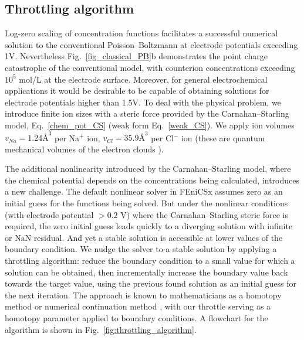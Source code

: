 \subsection{Throttling algorithm}

Log-zero scaling of concentration functions facilitates a successful numerical solution to
the conventional Poisson--Boltzmann at electrode potentials
exceeding 1V. Nevertheless Fig.~\ref{fig_classical_PB}b demonstrates the
point charge catastrophe of the conventional model, with counterion
concentrations exceeding $10^{5}$ mol/L at the electrode
surface. Moreover, for general electrochemical applications it would
be desirable to be capable of obtaining solutions for electrode
potentials higher than 1.5V. To deal with the physical problem, we
introduce finite ion sizes with a steric force provided by the
Carnahan--Starling model, Eq.~\eqref{chem_pot_CS} (weak form
Eq.~\eqref{weak_CS}).  We apply ion volumes
$v_{{Na}}=1.24 \textrm{\AA}^{3}$ per {Na}$^{+}$ ion,
$v_{{Cl}}=35.9 \textrm{\AA}^{3}$ per {Cl}$^{-}$ ion (these are
quantum mechanical volumes of the electron clouds \citep{ParsonsNinham2009}).

The additional nonlinearity introduced by the Carnahan--Starling model,
where the chemical potential depends on the concentrations being
calculated, introduces a new challenge. The default nonlinear solver
in FEniCSx assumes zero as an initial guess for the functions being
solved. But under the nonlinear conditions (with electrode potential
$>0.2$ V) where the Carnahan--Starling steric force is required, the
zero initial guess leads quickly to a diverging solution with infinite
or NaN
residual. And yet a stable solution is accessible at lower values of
the boundary condition. We nudge the solver to a stable solution by
applying a throttling algorithm: reduce the boundary condition to a
small value for which a solution can be obtained, then incrementally
increase the boundary value back towards the target value, using the
previous found solution as an initial guess for the next
iteration. The approach is known to mathematicians as a homotopy
method \citep{homotopy_analysis_Liao2012}
or numerical continuation method \citep{allgower1990numerical},
with our throttle serving as a homotopy parameter applied to boundary
conditions.  A flowchart for the algorithm is shown in
Fig.~\ref{fig:throttling_algorithm}.

